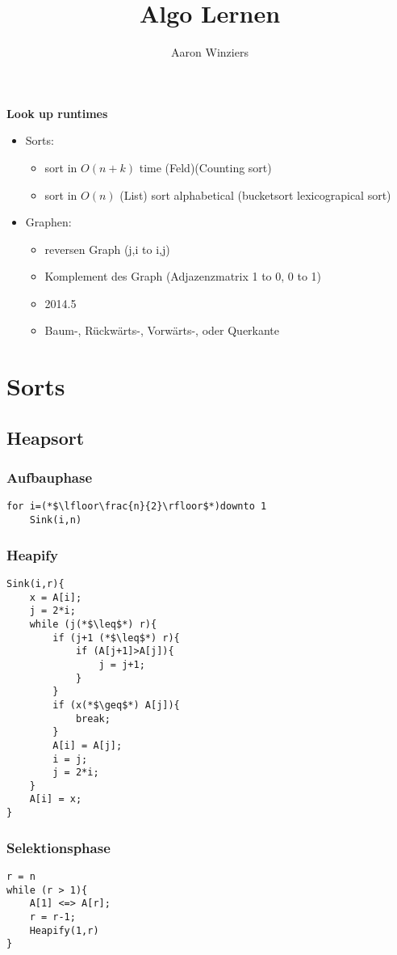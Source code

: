 \documentclass[10pt,a4paper]{article}
\author{Aaron Winziers}
\title{Algo Lernen}
\begin{document}
	{\huge\textbf{Look up runtimes}}
	\begin{itemize}
		\item Sorts:
		\begin{itemize}
			\item sort in $O(n+k)$ time (Feld)(Counting sort)
			\item sort in $O(n)$ (List)
			\subitem sort alphabetical (bucketsort lexicograpical sort)
		\end{itemize}
		\item Graphen:
		\begin{itemize}
			\item reversen Graph (j,i to i,j)
			\item Komplement des Graph (Adjazenzmatrix 1 to 0, 0 to 1)
			\item 2014.5
			\item Baum-, Rückwärts-, Vorwärts-, oder Querkante
		\end{itemize}
	\end{itemize}

\section{Sorts}
	\subsection{Heapsort}
		\subsubsection{Aufbauphase}
			\begin{lstlisting}
for i=(*$\lfloor\frac{n}{2}\rfloor$*)downto 1
	Sink(i,n)
			\end{lstlisting}
		\subsubsection{Heapify}
			\begin{lstlisting}
Sink(i,r){
	x = A[i];
	j = 2*i;
	while (j(*$\leq$*) r){
		if (j+1 (*$\leq$*) r){
			if (A[j+1]>A[j]){
				j = j+1;
			}
		}
		if (x(*$\geq$*) A[j]){
			break;
		}
		A[i] = A[j];
		i = j;
		j = 2*i;
	}
	A[i] = x;
}			
			\end{lstlisting}
		\subsubsection{Selektionsphase}
			\begin{lstlisting}
r = n
while (r > 1){
	A[1] <=> A[r];
	r = r-1;
	Heapify(1,r)
}
			\end{lstlisting}
\end{document}
